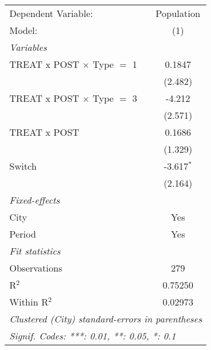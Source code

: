 \begingroup
\centering
\begin{tabular}{lc}
   \tabularnewline \midrule \midrule
   Dependent Variable:               & Population\\  
   Model:                            & (1)\\  
   \midrule
   \emph{Variables}\\
   TREAT x POST $\times$ Type $=$ 1  & 0.1847\\   
                                     & (2.482)\\   
   TREAT x POST $\times$ Type $=$ 3  & -4.212\\   
                                     & (2.571)\\   
   TREAT x POST                      & 0.1686\\   
                                     & (1.329)\\   
   Switch                            & -3.617$^{*}$\\   
                                     & (2.164)\\   
   \midrule
   \emph{Fixed-effects}\\
   City                              & Yes\\  
   Period                            & Yes\\  
   \midrule
   \emph{Fit statistics}\\
   Observations                      & 279\\  
   R$^2$                             & 0.75250\\  
   Within R$^2$                      & 0.02973\\  
   \midrule \midrule
   \multicolumn{2}{l}{\emph{Clustered (City) standard-errors in parentheses}}\\
   \multicolumn{2}{l}{\emph{Signif. Codes: ***: 0.01, **: 0.05, *: 0.1}}\\
\end{tabular}
\par\endgroup
